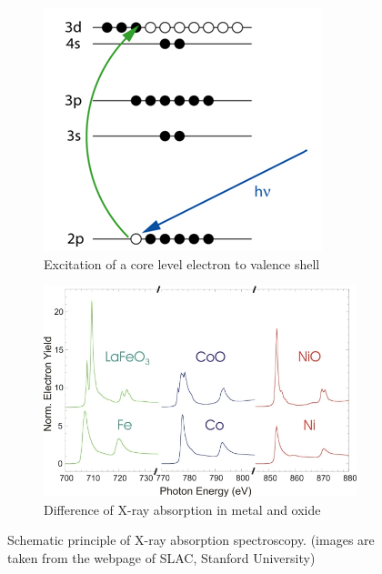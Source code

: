 \documentclass[main.tex]{subfiles}
\begin{document}
\begin{figure}[!htb]
\centering
	\begin{subfigure}[h]{0.4\textwidth}
		\centering
		\includegraphics[width=\linewidth]{XAS1}
  		\caption{Excitation of a core level electron to valence shell}
	\end{subfigure}
	\begin{subfigure}[h]{0.51\textwidth}
  		\centering
  		\includegraphics[width=\linewidth]{XAS3}
  		\caption{Difference of X-ray absorption in metal and oxide}
	\end{subfigure}
\caption{Schematic principle of X-ray absorption spectroscopy. (images are taken from the webpage of SLAC, Stanford University)}
\label{fig:fig}

\end{figure}
\FloatBarrier
\end{document}
